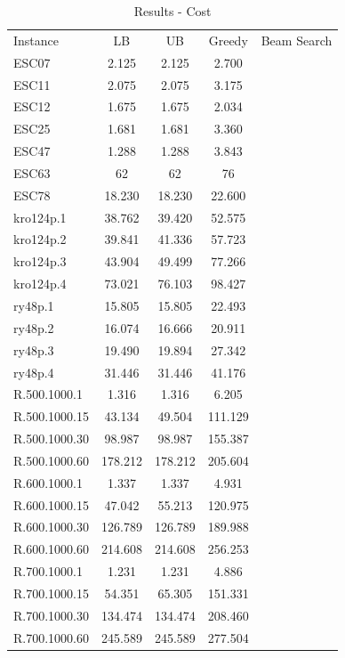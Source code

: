 \documentclass[]{article}
\begin{document}
    \begin{table}[htb]
		\begin{tabular}{lcccc}
			Instance & LB & UB & Greedy & Beam Search \\
			ESC07 & 2.125 & 2.125 & 2.700 & \\
			ESC11 & 2.075 & 2.075 & 3.175 & \\
			ESC12 & 1.675 & 1.675 & 2.034 & \\
			ESC25 & 1.681 & 1.681 & 3.360 & \\
			ESC47 & 1.288 & 1.288 & 3.843 & \\
			ESC63 & 62	  & 62    & 76 & \\
			ESC78 & 18.230 & 18.230 & 22.600 & \\
			kro124p.1 & 38.762 & 39.420 & 52.575 & \\
			kro124p.2 & 39.841 & 41.336 & 57.723 & \\
			kro124p.3 & 43.904 & 49.499 & 77.266 & \\
			kro124p.4 & 73.021 & 76.103 & 98.427 & \\
			ry48p.1   & 15.805 & 15.805 & 22.493 & \\
			ry48p.2   & 16.074 & 16.666 & 20.911 & \\
			ry48p.3   & 19.490 & 19.894 & 27.342 & \\
			ry48p.4   & 31.446 & 31.446 & 41.176 & \\
			R.500.1000.1  & 1.316   & 1.316 & 6.205 & \\
			R.500.1000.15 & 43.134  & 49.504 & 111.129 & \\
			R.500.1000.30 & 98.987  & 98.987 & 155.387 & \\
			R.500.1000.60 & 178.212 & 178.212 & 205.604 & \\
			R.600.1000.1  & 1.337   & 1.337 & 4.931 & \\
			R.600.1000.15 & 47.042  & 55.213 & 120.975 & \\
			R.600.1000.30 & 126.789 & 126.789 & 189.988 & \\
			R.600.1000.60 & 214.608 & 214.608 & 256.253 & \\
			R.700.1000.1  & 1.231   & 1.231 & 4.886 & \\
			R.700.1000.15 & 54.351  & 65.305 & 151.331 & \\
			R.700.1000.30 & 134.474 & 134.474 & 208.460 & \\
			R.700.1000.60 & 245.589 & 245.589 & 277.504 & \\
		\end{tabular}
		\caption{Results - Cost}
		\label{table:results_cost}
	\end{table}
\end{document}
